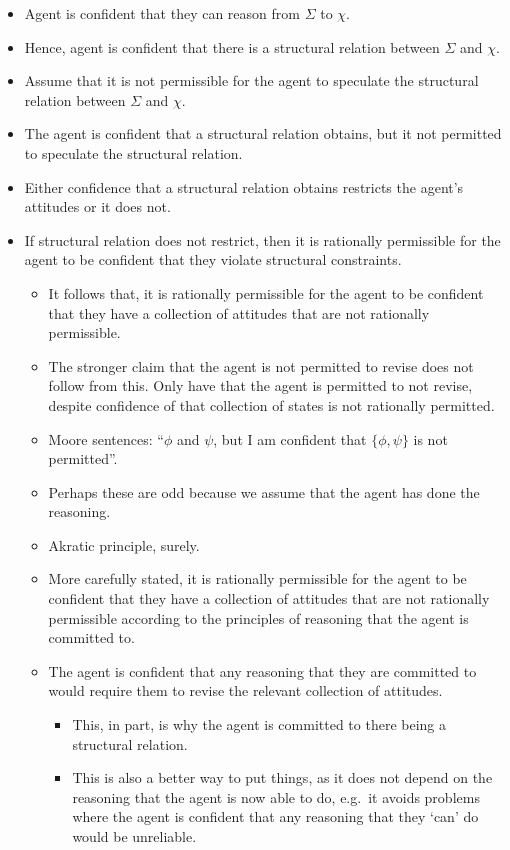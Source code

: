 \documentclass[10pt]{article}
\begin{document}
\begin{itemize}
\item Agent is confident that they can reason from \(\Sigma\) to \(\chi\).
\item Hence, agent is confident that there is a structural relation between \(\Sigma\) and \(\chi\).
\item Assume that it is not permissible for the agent to speculate the structural relation between \(\Sigma\) and \(\chi\).
\item The agent is confident that a structural relation obtains, but it not permitted to speculate the structural relation.
\item Either confidence that a structural relation obtains restricts the agent's attitudes or it does not.
\item If structural relation does not restrict, then it is rationally permissible for the agent to be confident that they violate structural constraints.
  \begin{itemize}
  \item It follows that, it is rationally permissible for the agent to be confident that they have a collection of attitudes that are not rationally permissible.
  \item The stronger claim that the agent is not permitted to revise does not follow from this.
    Only have that the agent is permitted to not revise, despite confidence of that collection of states is not rationally permitted.
  \item Moore sentences: ``\(\phi\) and \(\psi\), but I am confident that \(\{\phi,\psi\}\) is not permitted''.
  \item Perhaps these are odd because we assume that the agent has done the reasoning.
  \item Akratic principle, surely.
  \item More carefully stated, it is rationally permissible for the agent to be confident that they have a collection of attitudes that are not rationally permissible according to the principles of reasoning that the agent is committed to.
  \item The agent is confident that any reasoning that they are committed to would require them to revise the relevant collection of attitudes.
    \begin{itemize}
    \item This, in part, is why the agent is committed to there being a structural relation.
    \item This is also a better way to put things, as it does not depend on the reasoning that the agent is now able to do, e.g.\ it avoids problems where the agent is confident that any reasoning that they `can' do would be unreliable.
    \end{itemize}
  \end{itemize}
\end{itemize}
\end{document}
